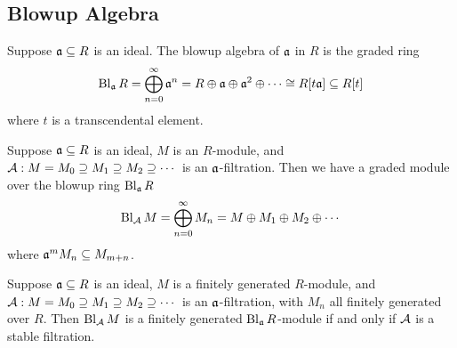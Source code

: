 \subsection*{Blowup Algebra}

\begin{definition}
    Suppose \(\mathfrak{a} \subseteq R\) is an ideal.
    The blowup algebra of \(\mathfrak{a}\) in \(R\) is the graded ring
    \begin{equation*}
        \operatorname{Bl}_{\mathfrak{a}} R = \bigoplus_{n=0}^\infty \mathfrak{a}^n = R \oplus \mathfrak{a} \oplus \mathfrak{a}^2 \oplus \cdots
        \cong R[t\mathfrak{a}] \subseteq R[t]
    \end{equation*}
    where \(t\) is a transcendental element.
\end{definition}
\begin{definition}
    Suppose \(\mathfrak{a} \subseteq R\) is an ideal, \(M\) is an \(R\)-module,
    and \(\mathcal{A}: M = M_0 \supseteq M_1 \supseteq M_2 \supseteq \cdots\) is an \(\mathfrak{a}\)-filtration.
    Then we have a graded module over the blowup ring \(\operatorname{Bl}_{\mathfrak{a}} R\)
    \begin{equation*}
        \operatorname{Bl}_{\mathcal{A}} M = \bigoplus_{n=0}^\infty M_n = M \oplus M_1 \oplus M_2 \oplus \cdots
    \end{equation*}
    where \(\mathfrak{a}^m M_n \subseteq M_{m+n}\).
\end{definition}
\begin{lemma}\label{lem:stable-blowup}
    Suppose \(\mathfrak{a} \subseteq R\) is an ideal, \(M\) is a finitely generated \(R\)-module,
    and \(\mathcal{A}: M = M_0 \supseteq M_1 \supseteq M_2 \supseteq \cdots\) is an \(\mathfrak{a}\)-filtration,
    with \(M_n\) all finitely generated over \(R\).
    Then \(\operatorname{Bl}_{\mathcal{A}} M\) is a finitely generated \(\operatorname{Bl}_{\mathfrak{a}} R\)-module
    if and only if \(\mathcal{A}\) is a stable filtration.
\end{lemma}
